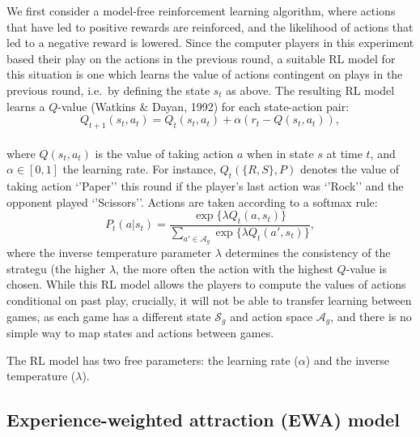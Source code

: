 \documentclass[
  english,
  man,floatsintext]{apa6}
\begin{document}
We first consider a model-free reinforcement learning algorithm, where actions that have led to positive rewards are reinforced, and the likelihood of actions that led to a negative reward is lowered. Since the computer players in this experiment based their play on the actions in the previous round, a suitable RL model for this situation is one which learns the value of actions contingent on plays in the previous round, i.e.~by defining the state \(s_{t}\) as above. The resulting RL model learns a \(Q\)-value (Watkins \& Dayan, 1992) for each state-action pair:
\[ Q_{t+1}(s_{t},a_{t}) = Q_{t}(s_{t},a_{t}) + \alpha \left( r_{t}  - Q(s_{t},a_{t}) \right) ,\]\\
where \(Q(s_{t},a_{t})\) is the value of taking action \(a\) when in state \(s\) at time \(t\), and \(\alpha \in [0,1]\) the learning rate. For instance, \(Q_t(\{R,S\},P)\) denotes the value of taking action `'Paper'' this round if the player's last action was `'Rock'' and the opponent played `'Scissors''. Actions are taken according to a softmax rule:
\[P_{t}(a|s_t) = \frac{\exp \{ \lambda Q_{t}(a,s_t) \}}{\sum_{a' \in \mathcal{A}_g} \exp \{\lambda  Q_{t}(a',s_t) \}}, \]
where the inverse temperature parameter \(\lambda\) determines the consistency of the strategu (the higher \(\lambda\), the more often the action with the highest \(Q\)-value is chosen. While this RL model allows the players to compute the values of actions conditional on past play, crucially, it will not be able to transfer learning between games, as each game has a different state \(\mathcal{S}_g\) and action space \(\mathcal{A}_g\), and there is no simple way to map states and actions between games.

The RL model has two free parameters: the learning rate (\(\alpha\)) and the inverse temperature (\(\lambda\)).

\hypertarget{experience-weighted-attraction-ewa-model}{%
\subsection{Experience-weighted attraction (EWA) model}\label{experience-weighted-attraction-ewa-model}}
\end{document}
